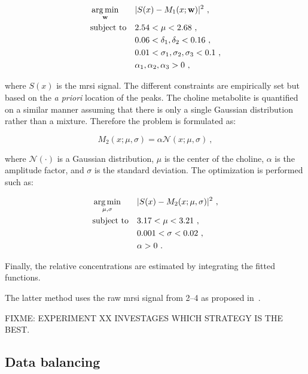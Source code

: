 \documentclass[a4paper,num-refs]{wiley-article}
\begin{document}
\begin{equation}
\begin{aligned}
& \operatorname*{arg\,min}_{\mathbf{w}} 
& & | S(x) - M_1(x; \mathbf{w}) |^{2} \ , \label{eq:mincostcit} \\
& \text{subject to}
& & 2.54 < \mu < 2.68 \ , \\
&&& 0.06 < \delta_1, \delta_2 < 0.16 \ , \\
&&& 0.01 < \sigma_1, \sigma_2, \sigma_3 < 0.1 \ , \\
&&& \alpha_1, \alpha_2, \alpha_3 > 0 \ ,
\end{aligned}
\end{equation}

\noindent where $S(x)$ is the \ac{mrsi} signal. The different constraints are
empirically set but based on the \emph{a priori} location of the peaks.
The choline metabolite is quantified on a similar manner assuming that there is
only a single Gaussian distribution rather than a mixture. Therefore the
problem is formulated as:

\begin{equation}
  M_2(x; \mu, \sigma) = \alpha \mathcal{N}(x; \mu, \sigma) \ ,
  \label{eq:costcho}
\end{equation}

\noindent where $\mathcal{N}(\cdot)$ is a Gaussian distribution, $\mu$ is the
center of the choline, $\alpha$ is the amplitude factor, and $\sigma$ is the
standard deviation. The optimization is performed such as:

\begin{equation}
\begin{aligned}
& \operatorname*{arg\,min}_{\mathbf{\mu, \sigma}} 
& & | S(x) - M_2(x; \mu, \sigma) |^{2} \ , \label{eq:mincostcho} \\
& \text{subject to}
& & 3.17 < \mu < 3.21 \ , \\
&&& 0.001 < \sigma < 0.02 \ , \\
&&& \alpha > 0 \ .
\end{aligned}
\end{equation}

Finally, the relative concentrations are estimated by integrating the fitted
functions.

The latter method uses the raw \ac{mrsi} signal from \SIrange{2}{4}{\ppm} as
proposed in~\cite{Parfait2012}.

FIXME: EXPERIMENT XX INVESTAGES WHICH STRATEGY IS THE BEST.

\subsection{Data balancing}
\end{document}
